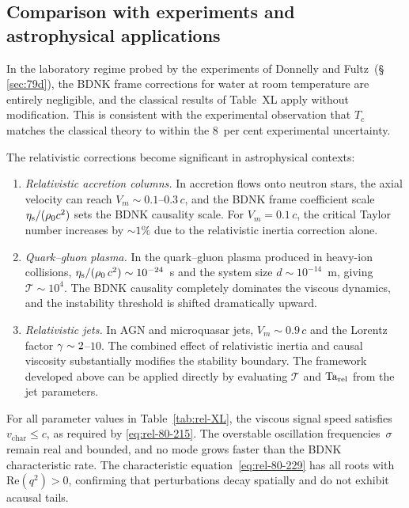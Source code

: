 \subsection{Comparison with experiments and astrophysical
applications}\label{sec:rel-80-comparison}

In the laboratory regime probed by the experiments of Donnelly and
Fultz~(\S\,\ref{sec:79d}), the BDNK frame corrections for
water at room temperature are entirely negligible, and the classical results of
Table~XL apply without modification.  This is consistent with the
experimental observation that $T_{c}$ matches the classical theory to
within the 8~per cent experimental uncertainty.

The relativistic corrections become significant in astrophysical
contexts:
\begin{enumerate}
\item \emph{Relativistic accretion columns.}
  In accretion flows onto neutron stars, the axial velocity can reach
  $V_{m}\sim 0.1$--$0.3\,c$, and the BDNK frame coefficient scale
  $\eta_{\mathrm{s}}/(\rho_0 c^{2})$ sets the BDNK causality scale.
  For $V_{m}=0.1\,c$, the critical Taylor number increases by
  $\sim 1\%$ due to the relativistic inertia correction alone.

\item \emph{Quark--gluon plasma.}
  In the quark--gluon plasma produced in heavy-ion collisions,
  $\eta_{\mathrm{s}}/(\rho_0\,c^{2})\sim 10^{-24}$~s and the system
  size $d\sim 10^{-14}$~m, giving $\mathcal{T}\sim 10^{4}$.  The
  BDNK causality completely dominates the viscous
  dynamics, and the instability threshold is shifted dramatically
  upward.

\item \emph{Relativistic jets.}
  In AGN and microquasar jets, $V_{m}\sim 0.9\,c$ and the Lorentz
  factor $\gamma\sim 2$--$10$.  The combined effect of relativistic
  inertia and causal viscosity substantially modifies the stability
  boundary.  The framework developed above can be applied directly
  by evaluating $\mathcal{T}$ and $\mathrm{Ta}_{\mathrm{rel}}$ from the jet parameters.
\end{enumerate}

\begin{causalitycheck}
For all parameter values in Table~\ref{tab:rel-XL}, the viscous
signal speed satisfies
$v_{\mathrm{char}} \le c$,
as required by \eqref{eq:rel-80-215}.  The overstable oscillation
frequencies~$\sigma$ remain real and bounded, and no mode
grows faster than the BDNK characteristic rate.  The
characteristic equation~\eqref{eq:rel-80-229} has all roots with
$\mathrm{Re}(q^{2})>0$, confirming that perturbations decay
spatially and do not exhibit acausal tails.
\end{causalitycheck}

